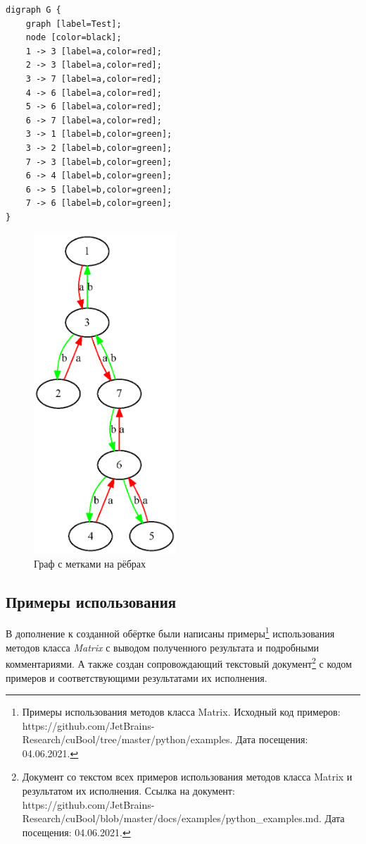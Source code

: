\documentclass[14pt]{matmex-diploma}
\begin{document}
\newpage
\begin{lstlisting}[caption={Скрипт на языке DOT, описывающий граф.}, label=lst:dotScript]
digraph G {
    graph [label=Test];
    node [color=black];
    1 -> 3 [label=a,color=red];
    2 -> 3 [label=a,color=red];
    3 -> 7 [label=a,color=red];
    4 -> 6 [label=a,color=red];
    5 -> 6 [label=a,color=red];
    6 -> 7 [label=a,color=red];
    3 -> 1 [label=b,color=green];
    3 -> 2 [label=b,color=green];
    7 -> 3 [label=b,color=green];
    6 -> 4 [label=b,color=green];
    6 -> 5 [label=b,color=green];
    7 -> 6 [label=b,color=green];
}
\end{lstlisting}

\begin{figure}[hb]
    \centering
    \includegraphics[height=12cm]{pictures/graphviz.eps}
    \caption{Граф с метками на рёбрах}\label{pic:graph}
\end{figure}

\subsection{Примеры использования}
В дополнение к созданной обёртке были написаны примеры\footnote{
Примеры использования методов класса Matrix.
Исходный код примеров: https://github.com/JetBrains-Research/cuBool/tree/master/python/examples. Дата посещения: 04.06.2021.
}
использования методов класса \textit{Matrix}
с выводом полученного результата и подробными комментариями. 
А также создан сопровождающий текстовый документ\footnote{
Документ со текстом всех примеров использования методов класса Matrix и результатом их исполнения.
Ссылка на документ: https://github.com/JetBrains-Research/cuBool/blob/master/docs/examples/python\_examples.md.
Дата посещения: 04.06.2021.}
с кодом примеров и соответствующими результатами их исполнения.
\end{document}
